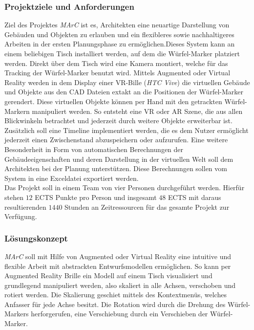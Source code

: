 \subsubsection{Projektziele und Anforderungen}
Ziel des Projektes \textit{MArC} ist es, Architekten eine neuartige Darstellung von Gebäuden und Objekten zu erlauben und ein flexibleres sowie nachhaltigeres Arbeiten in der ersten Planungsphase zu ermöglichen.Dieses System kann an einem beliebigen Tisch installiert werden, auf dem die Würfel-Marker platziert werden. Direkt über dem Tisch wird eine Kamera montiert, welche für das Tracking der Würfel-Marker benutzt wird.  Mittels Augmented oder Virtual Reality werden in dem Display einer VR-Bille (\textit{HTC Vive}) die virtuellen Gebäude und Objekte aus den CAD Dateien extakt an die Positionen der Würfel-Marker gerendert. Diese virtuellen Objekte können per Hand mit den getrackten Würfel-Markern manipuliert werden. So entsteht eine VR oder AR Szene, die aus allen Blickwinkeln betrachtet und jederzeit durch weitere Objekte erweiterbar ist. \\
Zusätzlich soll eine Timeline implementiert werden, die es dem Nutzer ermöglicht jederzeit einen Zwischenstand abzuspeichern oder aufzurufen. Eine weitere Besonderheit in Form von automatischen Berechnungen der Gebäudeeigenschaften und deren Darstellung in der virtuellen Welt soll dem Architekten bei der Planung unterstützen. Diese Berechnungen sollen vom System in eine Exceldatei exportiert werden.\\
Das Projekt soll in einem Team von vier Personen durchgeführt werden. Hierfür stehen $12$ ECTS Punkte pro Person und insgesamt $48$ ECTS mit daraus resultierenden $1440$ Stunden an Zeitressourcen für das gesamte Projekt zur Verfügung.


\subsubsection{Lösungskonzept}
\textit{MArC} soll mit Hilfe von Augmented oder Virtual Reality eine intuitive und flexible Arbeit mit abstrackten Entwurfsmodellen ermöglichen. So kann per Augmented Reality Brille ein Modell auf einem Tisch visualisiert und grundlegend manipuliert werden, also skaliert in alle Achsen, verschoben und rotiert werden. Die Skalierung geschiet mittels des Kontextmenüs, welches Anfasser für jede Achse besitzt. Die Rotation wird durch die Drehung des Würfel-Markers herforgerufen, eine Verschiebung durch ein Verschieben der Würfel-Marker.

